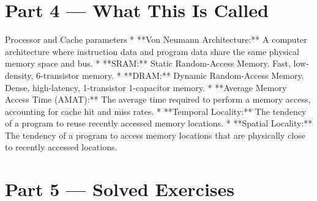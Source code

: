 \documentclass[12pt, a4paper]{book}
\begin{document}
\newpage

\section{Part 4 --- What This Is Called}

\begin{namedconcept}{Processor and Cache parameters}
* **Von Neumann Architecture:** A computer architecture where instruction data and program data share the same physical memory space and bus.
* **SRAM:** Static Random-Access Memory. Fast, low-density, 6-transistor memory.
* **DRAM:** Dynamic Random-Access Memory. Dense, high-latency, 1-transistor 1-capacitor memory.
* **Average Memory Access Time (AMAT):** The average time required to perform a memory access, accounting for cache hit and miss rates.
* **Temporal Locality:** The tendency of a program to reuse recently accessed memory locations.
* **Spatial Locality:** The tendency of a program to access memory locations that are physically close to recently accessed locations.
\end{namedconcept}

\newpage

\section{Part 5 --- Solved Exercises}
\end{document}
